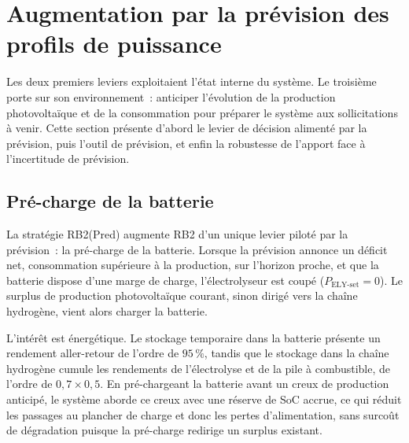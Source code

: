 %

\section{Augmentation par la prévision des profils de puissance}
\label{sec:prediction}

Les deux premiers leviers exploitaient l'état interne du système. Le troisième porte sur son environnement~: anticiper l'évolution de la production photovoltaïque et de la consommation pour préparer le système aux sollicitations à venir. Cette section présente d'abord le levier de décision alimenté par la prévision, puis l'outil de prévision, et enfin la robustesse de l'apport face à l'incertitude de prévision.

\subsection{Pré-charge de la batterie}
\label{subsec:precharge}

La stratégie RB2(Pred) augmente RB2 d'un unique levier piloté par la prévision~: la pré-charge de la batterie. Lorsque la prévision annonce un déficit net, consommation supérieure à la production, sur l'horizon proche, et que la batterie dispose d'une marge de charge, l'électrolyseur est coupé ($P_{\text{ELY-set}}=0$). Le surplus de production photovoltaïque courant, sinon dirigé vers la chaîne hydrogène, vient alors charger la batterie.

L'intérêt est énergétique. Le stockage temporaire dans la batterie présente un rendement aller-retour de l'ordre de $95\,\%$, tandis que le stockage dans la chaîne hydrogène cumule les rendements de l'électrolyse et de la pile à combustible, de l'ordre de $0{,}7 \times 0{,}5$. En pré-chargeant la batterie avant un creux de production anticipé, le système aborde ce creux avec une réserve de SoC accrue, ce qui réduit les passages au plancher de charge et donc les pertes d'alimentation, sans surcoût de dégradation puisque la pré-charge redirige un surplus existant.

